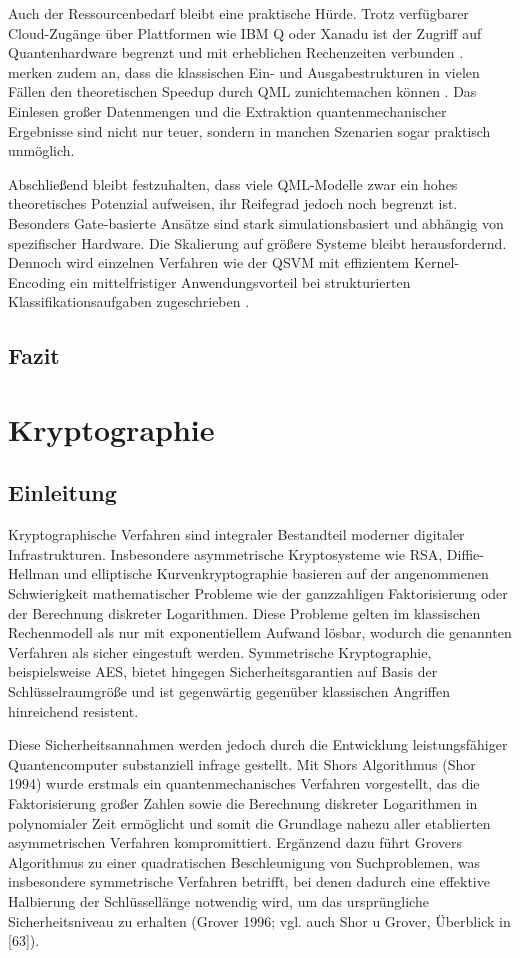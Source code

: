 Auch der Ressourcenbedarf bleibt eine praktische Hürde. Trotz verfügbarer Cloud-Zugänge über Plattformen wie IBM Q oder Xanadu ist der Zugriff auf Quantenhardware begrenzt und mit erheblichen Rechenzeiten verbunden \cite{peralgarcia2024}. \cite{zhang2020} merken zudem an, dass die klassischen Ein- und Ausgabestrukturen in vielen Fällen den theoretischen Speedup durch QML zunichtemachen können \cite[S.~19]{zhang2020}. Das Einlesen großer Datenmengen und die Extraktion quantenmechanischer Ergebnisse sind nicht nur teuer, sondern in manchen Szenarien sogar praktisch unmöglich.

Abschließend bleibt festzuhalten, dass viele QML-Modelle zwar ein hohes theoretisches Potenzial aufweisen, ihr Reifegrad jedoch noch begrenzt ist. Besonders Gate-basierte Ansätze sind stark simulationsbasiert und abhängig von spezifischer Hardware. Die Skalierung auf größere Systeme bleibt herausfordernd. Dennoch wird einzelnen Verfahren wie der QSVM mit effizientem Kernel-Encoding ein mittelfristiger Anwendungsvorteil bei strukturierten Klassifikationsaufgaben zugeschrieben \cite[S.~10--12]{uddin2024}.


\subsection{Fazit}

\vspace{2em}

\section{Kryptographie}
\subsection{Einleitung}
Kryptographische Verfahren sind integraler Bestandteil moderner digitaler Infrastrukturen. Insbesondere asymmetrische Kryptosysteme wie RSA, Diffie-Hellman und elliptische Kurvenkryptographie basieren auf der angenommenen Schwierigkeit mathematischer Probleme wie der ganzzahligen Faktorisierung oder der Berechnung diskreter Logarithmen. Diese Probleme gelten im klassischen Rechenmodell als nur mit exponentiellem Aufwand lösbar, wodurch die genannten Verfahren als sicher eingestuft werden. Symmetrische Kryptographie, beispielsweise AES, bietet hingegen Sicherheitsgarantien auf Basis der Schlüsselraumgröße und ist gegenwärtig gegenüber klassischen Angriffen hinreichend resistent.

Diese Sicherheitsannahmen werden jedoch durch die Entwicklung leistungsfähiger Quantencomputer substanziell infrage gestellt. Mit Shors Algorithmus (Shor 1994) wurde erstmals ein quantenmechanisches Verfahren vorgestellt, das die Faktorisierung großer Zahlen sowie die Berechnung diskreter Logarithmen in polynomialer Zeit ermöglicht und somit die Grundlage nahezu aller etablierten asymmetrischen Verfahren kompromittiert. Ergänzend dazu führt Grovers Algorithmus zu einer quadratischen Beschleunigung von Suchproblemen, was insbesondere symmetrische Verfahren betrifft, bei denen dadurch eine effektive Halbierung der Schlüssellänge notwendig wird, um das ursprüngliche Sicherheitsniveau zu erhalten (Grover 1996; vgl. auch Shor u Grover, Überblick in [63]).

